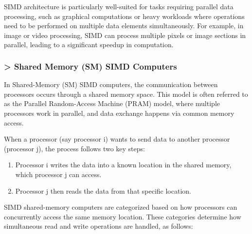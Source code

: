 \documentclass[a4paper, 10pt]{book}
\begin{document}
                SIMD architecture is particularly well-suited for tasks requiring parallel data processing, such as graphical computations or heavy workloads where operations need to be performed on multiple data elements simultaneously. For example, in image or video processing, SIMD can process multiple pixels or image sections in parallel, leading to a significant speedup in computation.

                \subsubsection{{\bold > \hspace{10pt} Shared Memory (SM) SIMD Computers}}

                    In Shared-Memory (SM) SIMD computers, the communication between processors occurs through a shared memory space. This model is often referred to as the Parallel Random-Access Machine (PRAM) model, where multiple processors work in parallel, and data exchange happens via common memory access.

                    When a processor (say {\bold processor i}) wants to send data to another processor ({\bold processor j}), the process follows two key steps:

                    \begin{enumerate}
                        
                        \item {\bold Processor i} writes the data into a known location in the shared memory, which {\bold processor j} can access.

                        \item {\bold Processor j} then reads the data from that specific location.
                        
                    \end{enumerate}

                    SIMD shared-memory computers are categorized based on how processors can concurrently access the same memory location. These categories determine how simultaneous read and write operations are handled, as follows:
\end{document}
